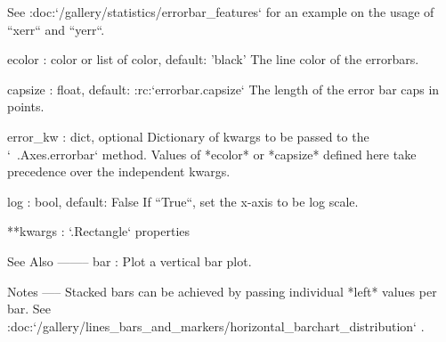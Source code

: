 \begin{DoxyVerb}
    See :doc:`/gallery/statistics/errorbar_features`
    for an example on the usage of ``xerr`` and ``yerr``.

ecolor : color or list of color, default: 'black'
    The line color of the errorbars.

capsize : float, default: :rc:`errorbar.capsize`
   The length of the error bar caps in points.

error_kw : dict, optional
    Dictionary of kwargs to be passed to the `~.Axes.errorbar`
    method. Values of *ecolor* or *capsize* defined here take
    precedence over the independent kwargs.

log : bool, default: False
    If ``True``, set the x-axis to be log scale.

**kwargs : `.Rectangle` properties


See Also
--------
bar : Plot a vertical bar plot.

Notes
-----
Stacked bars can be achieved by passing individual *left* values per
bar. See
:doc:`/gallery/lines_bars_and_markers/horizontal_barchart_distribution`
.
\end{DoxyVerb}
 \mbox{\label{classmatplotlib_1_1axes_1_1__axes_1_1Axes_a46dcdf5ee6ffacd43006a294350c7ab9}} 
